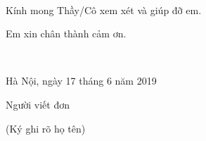 \documentclass[12pt]{memoir}
\begin{document}
\vfill
\vfill ~

Kính mong Thầy/Cô xem xét và giúp đỡ em.

Em xin chân thành cảm ơn.

\vfill

\begin{minipage}
	{0.5\textwidth}~
\end{minipage}
\begin{minipage}{0.5\textwidth}
\begin{center}
	Hà Nội, ngày 17 tháng 6 năm 2019\par
	Người viết đơn\par
	(Ký ghi rõ họ tên)
\end{center}
\end{minipage}

\vfill ~
\vfill ~
\vfill ~
\vfill ~
\end{document}
